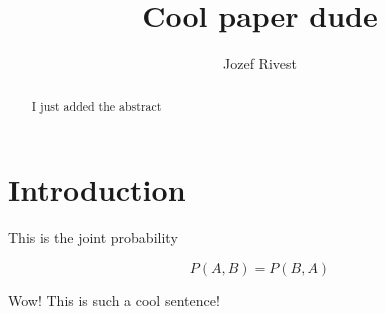 \documentclass[12pt]{article}
\title{Cool paper dude}
\author{Jozef Rivest}
\begin{document}
\maketitle
\begin{abstract}
	I just added the abstract
\end{abstract}

\section{Introduction}

This is the joint probability

\begin{equation}
	P(A,B) = P(B,A)
\end{equation}

Wow! This is such a cool sentence!

\printbibliography
\end{document}
